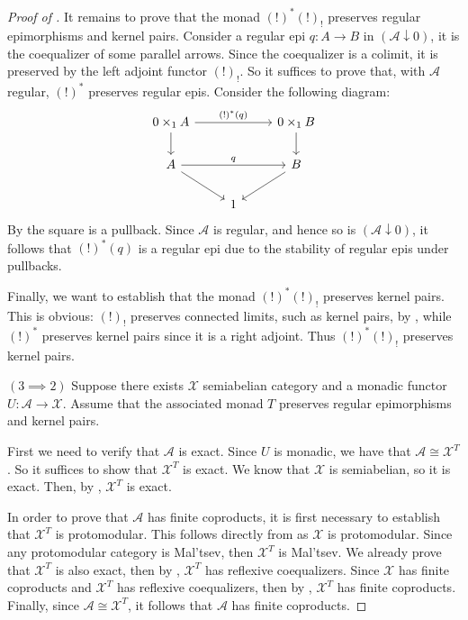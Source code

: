 \begin{subbox}{}
\begin{proof}[\textit{Proof of }]
    It remains to prove that the monad $(!)^*(!)_!$ preserves regular epimorphisms and kernel pairs. Consider a regular epi $q:A \to B$ in $(\mathcal{A} \downarrow 0)$, it is the coequalizer of some parallel arrows. Since the coequalizer is a colimit, it is preserved by the left adjoint functor $(!)_!$. So it suffices to prove that, with $\mathcal{A}$ regular, $(!)^*$ preserves regular epis. Consider the following diagram:
    \[%
    \begin{tikzcd}
    0\times_1A \arrow[d] \arrow[rr, "(!)^*(q)"] &   & 0\times_1B \arrow[d] \\
    A \arrow[rr, "q"] \arrow[rd]                &   & B \arrow[ld]         \\
                                                & 1 &                     
    \end{tikzcd}
    \]
    By  the square is a pullback. Since $\mathcal{A}$ is regular, and hence so is $(\mathcal{A} \downarrow 0)$, it follows that $(!)^*(q)$ is a regular epi due to the stability of regular epis under pullbacks.

    Finally, we want to establish that the monad $(!)^*(!)_!$ preserves kernel pairs. This is obvious: $(!)_!$ preserves connected limits, such as kernel pairs, by , while $(!)^*$ preserves kernel pairs since it is a right adjoint. Thus $(!)^*(!)_!$ preserves kernel pairs.

    $(3 \implies 2)$ Suppose there exists $\mathcal{X}$ semiabelian category and a monadic functor $U: \mathcal{A} \to \mathcal{X}$. Assume that the associated monad $T$ preserves regular epimorphisms and kernel pairs.
    
    First we need to verify that $\mathcal{A}$ is exact. Since $U$ is monadic, we have that $\mathcal{A} \cong \mathcal{X}^T$. So it suffices to show that $\mathcal{X}^T$ is exact. We know that $\mathcal{X}$ is semiabelian, so it is exact. Then, by , $\mathcal{X}^T$ is exact.

    In order to prove that $\mathcal{A}$ has finite coproducts, it is first necessary to establish that $\mathcal{X}^T$ is protomodular. This follows directly from  as $\mathcal{X}$ is protomodular. Since any protomodular category is Mal'tsev, then $\mathcal{X}^T$ is Mal'tsev. We already prove that $\mathcal{X}^T$ is also exact, then by , $\mathcal{X}^T$ has reflexive coequalizers. Since $\mathcal{X}$ has finite coproducts and $\mathcal{X}^T$ has reflexive coequalizers, then by , $\mathcal{X}^T$ has finite coproducts. Finally, since $\mathcal{A} \cong \mathcal{X}^T$, it follows that $\mathcal{A}$  has finite coproducts.


\end{proof}
\end{subbox}

